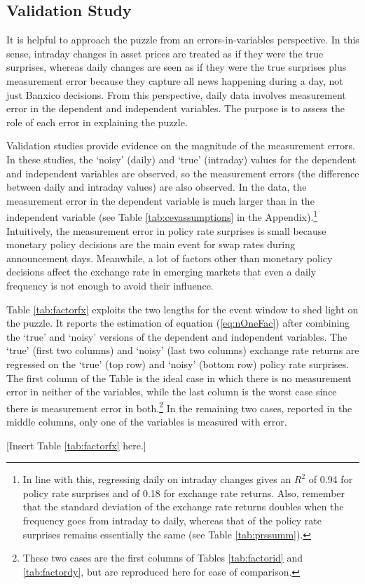 \documentclass[a4paper,12pt]{article} 		%
\begin{document}
\sectitlespace
\subsection{Validation Study} \label{sec:validation}
\sectitlespace
It is helpful to approach the puzzle from an errors-in-variables perspective. In this sense, intraday changes in asset prices are treated as if they were the true surprises, whereas daily changes are seen as if they were the true surprises plus measurement error because they capture all news happening during a day, not just Banxico decisions. From this perspective, daily data involves measurement error in the dependent and independent variables. The purpose is to assess the role of each error in explaining the puzzle.

Validation studies provide evidence on the magnitude of the measurement errors. In these studies, the `noisy' (daily) and `true' (intraday) values for the dependent and independent variables are observed, so the measurement errors (the difference between daily and intraday values) are also observed. In the data, the measurement error in the dependent variable is much larger than in the independent variable (see Table \ref{tab:cevassumptions} in the Appendix).\footnote{ In line with this, regressing daily on intraday changes gives an \(R^2\) of 0.94 for policy rate surprises and of 0.18 for exchange rate returns. Also, remember that the standard deviation of the exchange rate returns doubles when the frequency goes from intraday to daily, whereas that of the policy rate surprises remains essentially the same (see Table \ref{tab:prssumm}).} Intuitively, the measurement error in policy rate surprises is small because monetary policy decisions are the main event for swap rates during announcement days. Meanwhile, a lot of factors other than monetary policy decisions affect the exchange rate in emerging markets that even a daily frequency is not enough to avoid their influence.

Table \ref{tab:factorfx} exploits the two lengths for the event window to shed light on the puzzle. It reports the estimation of equation (\ref{eq:nOneFac}) after combining the `true’ and `noisy’ versions of the dependent and independent variables. The `true’ (first two columns) and `noisy’ (last two columns) exchange rate returns are regressed on the `true’ (top row) and `noisy’ (bottom row) policy rate surprises. The first column of the Table is the ideal case in which there is no measurement error in neither of the variables, while the last column is the worst case since there is measurement error in both.\footnote{These two cases are the first columns of Tables \ref{tab:factorid} and \ref{tab:factordy}, but are reproduced here for ease of comparison.} In the remaining two cases, reported in the middle columns, only one of the variables is measured with error.
%
\begin{center}
	[Insert Table \ref{tab:factorfx} here.]
\end{center}
\end{document}
